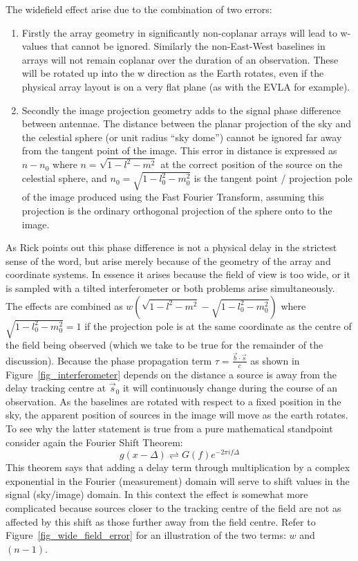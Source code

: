 The widefield effect arise due to the combination of two errors:
\begin{enumerate}
 \item Firstly the array geometry in significantly non-coplanar arrays will lead to w-values that cannot be ignored. Similarly the non-East-West baselines
 in arrays will not remain coplanar over the duration of an observation. These will be rotated up into the w direction as the Earth rotates, even if the physical 
 array layout is on a very flat plane (as with the EVLA for example).
 \item Secondly the image projection geometry adds to the signal phase difference between antennae. The distance between the planar projection of the sky and the 
 celestial sphere (or unit radius ``sky dome'') cannot be ignored far away from the tangent point of the image. This error in distance is expressed 
 as $n-n_0$ where $n = \sqrt{1-l^2-m^2}$ at the correct position of the source on the celestial sphere, and $n_0=\sqrt{1-l_0^2-m_0^2}$ is the 
 tangent point / projection pole of the image produced using the Fast Fourier Transform, assuming this projection is the ordinary orthogonal 
 projection of the sphere onto to the image.
\end{enumerate}
As Rick points out this phase difference is not a physical delay in the strictest sense of the word, but arise merely because of the geometry of the array and coordinate
systems. In essence it arises because the field of view is too wide, or it is sampled with a tilted interferometer or both problems arise simultaneously. The effects 
are combined as $w(\sqrt{1-l^2-m^2} - \sqrt{1-l_0^2-m_0^2})$ where $\sqrt{1-l_0^2-m_0^2} = 1$ if the projection pole is at the same coordinate as the centre
of the field being observed (which we take to be true for the remainder of the discussion). Because the phase propagation term $\tau = \frac{\vec{b}\cdot\vec{s}}{c}$ as 
shown in Figure~\ref{fig_interferometer} depends on the distance a source is away from the delay tracking centre at $\vec{s}_0$ it will continuously change during the course 
of an observation. As the baselines are rotated with respect to a fixed position in the sky, the apparent position of sources in the image will move as the earth rotates. To see why 
the latter statement is true from a pure mathematical standpoint consider again the Fourier Shift Theorem:
\begin{equation}
 g(x-\Delta) \rightleftharpoons G(f)e^{-2\pi if\Delta}
\end{equation}
This theorem says that adding a delay term through multiplication by a complex exponential in the Fourier (measurement) domain will serve to shift values in the 
signal (sky/image) domain. In this context the effect is somewhat more complicated because sources closer to the tracking centre of the field are not as affected 
by this shift as those further away from the field centre. Refer to Figure~\ref{fig_wide_field_error} for an illustration of the two terms: $w$ and $(n-1)$.

